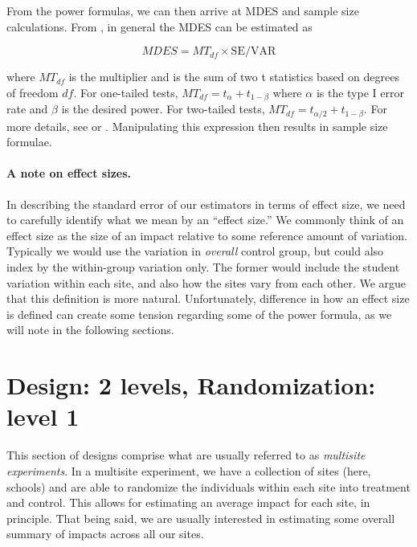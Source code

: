 \documentclass[12pt]{article}
\begin{document}
From the power formulas, we can then arrive at MDES and sample size calculations.
From \citet{Dong2013}, in general the MDES can be estimated as

$$ MDES = MT_{df} \times \text{SE} / \text{VAR} $$

where $MT_{df}$ is the multiplier and is the sum of two t statistics based on degrees of freedom $df$.
For one-tailed tests, $MT_{df} = t_{\alpha} + t_{1-\beta}$ where $\alpha$ is the type I error rate and $\beta$ is the desired power.  For two-tailed tests, $MT_{df} = t_{\alpha/2} + t_{1-\beta}$.
For more details, see \citet[page 31]{Dong2013} or \citet[page 22]{Bloom2006}.
Manipulating this expression then results in sample size formulae.


\paragraph{A note on effect sizes.}
In describing the standard error of our estimators in terms of effect size, we need to carefully identify what we mean by an ``effect size.''
We commonly think of an effect size as the size of an impact relative to some reference amount of variation.
Typically we would use the variation in \emph{overall} control group, but could also index by the within-group variation only.
The former would include the student variation within each site, and also how the sites vary from each other.
We argue that this definition is more natural.
Unfortunately, difference in how an effect size is defined can create some tension regarding some of the power formula, as we will note in the following sections.




\newpage
\section{Design: 2 levels, Randomization: level 1}

This section of designs comprise what are usually referred to as \emph{multisite experiments}.
In a multisite experiment, we have a collection of sites (here, schools) and are able to randomize the individuals within each site into treatment and control.
This allows for estimating an average impact for each site, in principle.
That being said, we are usually interested in estimating some overall summary of impacts across all our sites.
\end{document}
